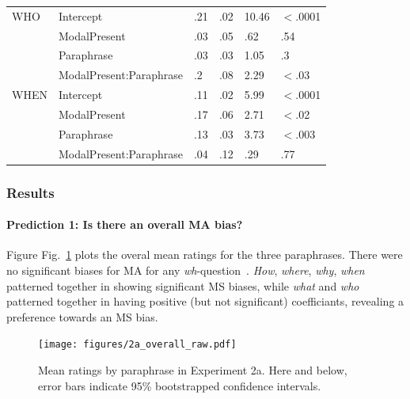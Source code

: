 \documentclass[12pt,letterpaper,table,svgnames,dvipsnames]{article}
\newcommand{\figref}[1]{Fig.~\ref{#1}}
\newcommand{\whq}{\emph{wh}-question~}
\begin{document}
\begin{table}
\begin{center}
\begin{tabular}{llllll}
\midrule
WHO & Intercept & .21 & .02 & 10.46 & $<$.0001\\
{} & ModalPresent & .03 & .05 & .62 & .54\\
{} & Paraphrase & .03 & .03 & 1.05 & .3\\
{} & ModalPresent:Paraphrase & .2 & .08 & 2.29 & $<$.03\\
\midrule
WHEN & Intercept & .11 & .02 & 5.99 & $<$.0001\\
{} & ModalPresent & .17 & .06 & 2.71 & $<$.02\\
{} & Paraphrase & .13 & .03 & 3.73 & $<$.003\\
{} & ModalPresent:Paraphrase & .04 & .12 & .29 & .77\\
\bottomrule
\end{tabular} 
\end{center} 
\end{table}



\subsubsection{Results}



\paragraph{Prediction 1: Is there an overall MA bias?}

Figure \figref{ex2a_overall} plots the overal mean ratings for the three paraphrases. There were no significant biases for MA for any \whq. \emph{How}, \emph{where}, \emph{why}, \emph{when} patterned together in showing significant MS biases, while \emph{what} and \emph{who} patterned together in having positive (but not significant) coefficiants, revealing a preference towards an MS bias.
\begin{figure}[h!]
\centering
\texttt{[image: figures/2a\_overall\_raw.pdf]}
\caption{Mean ratings by paraphrase in Experiment 2a. Here and below, error bars indicate 95\% bootstrapped confidence intervals.}
\label{ex2a_overall}
\end{figure}
\end{document}
